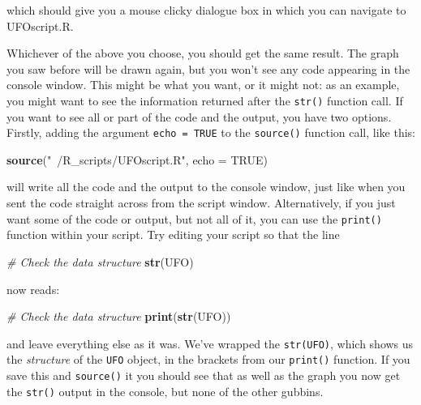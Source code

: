 \documentclass[
]{book}
\newenvironment{Shaded}{\begin{snugshade}}{\end{snugshade}}
\newcommand{\CommentTok}[1]{\textcolor[rgb]{0.56,0.35,0.01}{\textit{#1}}}
\newcommand{\DataTypeTok}[1]{\textcolor[rgb]{0.13,0.29,0.53}{#1}}
\newcommand{\KeywordTok}[1]{\textcolor[rgb]{0.13,0.29,0.53}{\textbf{#1}}}
\newcommand{\NormalTok}[1]{#1}
\newcommand{\OtherTok}[1]{\textcolor[rgb]{0.56,0.35,0.01}{#1}}
\newcommand{\StringTok}[1]{\textcolor[rgb]{0.31,0.60,0.02}{#1}}
\begin{document}
which should give you a mouse clicky dialogue box in which you can navigate to UFOscript.R.

Whichever of the above you choose, you should get the same result. The graph you saw before will be drawn again, but you won't see any code appearing in the console window. This might be what you want, or it might not: as an example, you might want to see the information returned after the \texttt{str()} function call. If you want to see all or part of the code and the output, you have two options. Firstly, adding the argument \texttt{echo\ =\ TRUE} to the \texttt{source()} function call, like this:

\begin{Shaded}
\begin{Highlighting}[]
\KeywordTok{source}\NormalTok{(}\StringTok{"~/R_scripts/UFOscript.R"}\NormalTok{, }\DataTypeTok{echo =} \OtherTok{TRUE}\NormalTok{)}
\end{Highlighting}
\end{Shaded}

will write all the code and the output to the console window, just like when you sent the code straight across from the script window. Alternatively, if you just want some of the code or output, but not all of it, you can use the \texttt{print()} function within your script. Try editing your script so that the line

\begin{Shaded}
\begin{Highlighting}[]
\CommentTok{# Check the data structure}
\KeywordTok{str}\NormalTok{(UFO)}
\end{Highlighting}
\end{Shaded}

now reads:

\begin{Shaded}
\begin{Highlighting}[]
\CommentTok{# Check the data structure}
\KeywordTok{print}\NormalTok{(}\KeywordTok{str}\NormalTok{(UFO))}
\end{Highlighting}
\end{Shaded}

and leave everything else as it was. We've wrapped the \texttt{str(UFO)}, which shows us the \emph{structure} of the \texttt{UFO} object, in the brackets from our \texttt{print()} function. If you save this and \texttt{source()} it you should see that as well as the graph you now get the \texttt{str()} output in the console, but none of the other gubbins.
\end{document}
